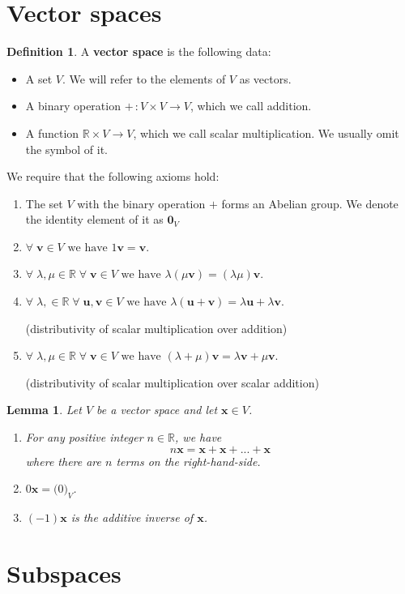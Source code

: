 \documentclass[11pt,a4paper]{article}
\newcommand\R{\mathbb{R}}
\newtheorem{lemma}{Lemma}
\theoremstyle{definition}
\newtheorem{definition}{Definition}
\begin{document}
\section{Vector spaces}
\begin{definition}
    A \textbf{vector space} is the following data:
    \begin{itemize}
        \item A set $V$. We will refer to the elements of $V$ as vectors.
        \item A binary operation $ + \, : V \times V \to V $, which we call addition.
        \item A function $ \R \times V \to V $, which we call scalar multiplication. We usually omit the symbol of it.
    \end{itemize}
    We require that the following axioms hold:
    \begin{enumerate}
        \item The set $V$ with the binary operation $+$ forms an Abelian group. We denote the identity element of it as $\mathbf{0}_V$
        \item $ \forall \; \mathbf{v} \in V \text{ we have } 1\mathbf{v} = \mathbf{v} $.
        \item $ \forall \; \lambda, \mu \in \R \; \forall \; \mathbf{v} \in V \text{ we have } \lambda (\mu \mathbf{v}) = (\lambda\mu)\mathbf{v} $.
        \item $ \forall \; \lambda, \in \R \; \forall \; \mathbf{u}, \mathbf{v} \in V \text{ we have } \lambda (\mathbf{u} + \mathbf{v}) = \lambda\mathbf{u} + \lambda\mathbf{v}$.

        (distributivity of scalar multiplication over addition)
        \item $ \forall \; \lambda, \mu \in \R \; \forall \; \mathbf{v} \in V \text{ we have } (\lambda + \mu) \mathbf{v} = \lambda\mathbf{v}  + \mu\mathbf{v} $.

        (distributivity of scalar multiplication over scalar addition)
    \end{enumerate}
\end{definition}

\begin{lemma}
    Let $ V $ be a vector space and let $ \mathbf{x} \in V $.
    \begin{enumerate}
        \item For any positive integer $ n \in \R $, we have 
        \[ n\mathbf{x} = \mathbf{x} + \mathbf{x} + ... + \mathbf{x} \]
        where there are $ n $ terms on the right-hand-side.
        \item $0 \mathbf{x} = \mathbf(0)_V $.
        \item $ (-1)\mathbf{x} $ is the additive inverse of $ \mathbf{x} $.
    \end{enumerate}
\end{lemma}

\section{Subspaces}
\end{document}
